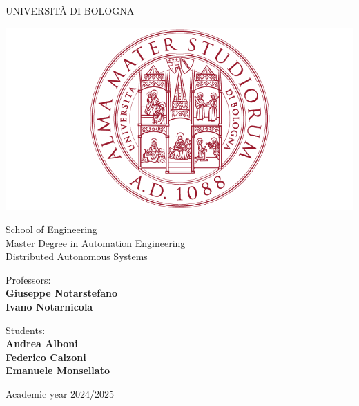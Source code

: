 \documentclass[a4paper,11pt,oneside]{book}
\begin{document}
\pagestyle{myheadings}

\thispagestyle{empty}                                                 
\begin{center}                                                            
    \vspace{5mm}
    {\LARGE UNIVERSIT\`A DI BOLOGNA} \\                       
      \vspace{5mm}
\end{center}
\begin{center}
  \includegraphics[scale=.27]{figs/logo_unibo}
\end{center}
\begin{center}
      \vspace{5mm}
      {\LARGE School of Engineering} \\
        \vspace{3mm}
      {\Large Master Degree in Automation Engineering} \\
      \vspace{20mm}
      {\LARGE Distributed Autonomous Systems} \\
      \vspace{15mm}
\end{center}
\begin{flushleft}                                                                              
     {\large Professors:}\\
     \textbf{Giuseppe Notarstefano} \\
     \textbf{Ivano Notarnicola} \\        
     \vspace{13mm}
\end{flushleft}
\begin{flushright}
      {\large Students:}\\
      \textbf{Andrea Alboni} \\
      \textbf{Federico Calzoni} \\
      \textbf{Emanuele Monsellato} \\
      \vspace{13mm}
\end{flushright}
\begin{center}
\vfill
      {\large Academic year 2024/2025} \\
\end{center}
\end{document}
